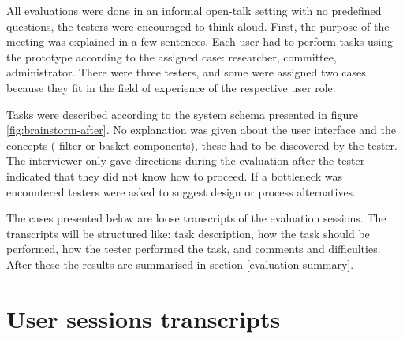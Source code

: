 All evaluations were done in an informal open-talk setting with no predefined questions, the testers were encouraged to think aloud.
First, the purpose of the meeting was explained in a few sentences.
Each user had to perform tasks using the prototype according to the assigned case: researcher, committee, administrator.
There were three testers, and some were assigned two cases because they fit in the field of experience of the respective user role.

Tasks were described according to the system schema presented in figure \ref{fig:brainstorm-after}.
No explanation was given about the user interface and the concepts (\eg{} filter or basket components), these had to be discovered by the tester.
The interviewer only gave directions during the evaluation after the tester indicated that they did not know how to proceed.
If a bottleneck was encountered testers were asked to suggest design or process alternatives.

The  cases presented below are loose transcripts of the evaluation sessions.
The transcripts will be structured like: task description, how the task should be performed, how the tester performed the task, and comments and difficulties.
After these the results are summarised in section \ref{evaluation-summary}.

\section{User sessions transcripts}


